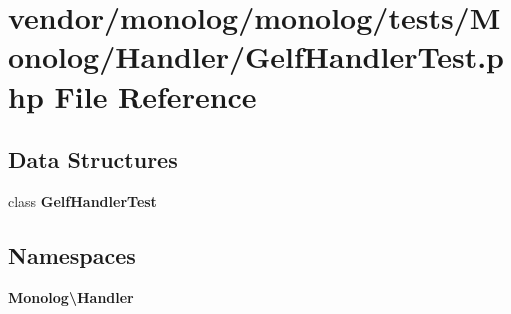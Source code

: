 \section{vendor/monolog/monolog/tests/\+Monolog/\+Handler/\+Gelf\+Handler\+Test.php File Reference}
\label{_gelf_handler_test_8php}
\subsection*{Data Structures}
\begin{DoxyCompactItemize}
\item 
class {\bf Gelf\+Handler\+Test}
\end{DoxyCompactItemize}
\subsection*{Namespaces}
\begin{DoxyCompactItemize}
\item 
 {\bf Monolog\textbackslash{}\+Handler}
\end{DoxyCompactItemize}
